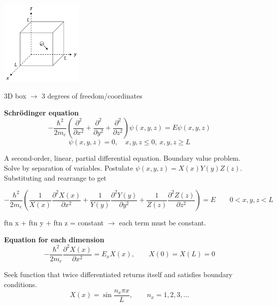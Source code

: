 \documentclass[11pt]{article}
\begin{document}
\begin{center}
\begin{center}
\includegraphics[width=0.3\textwidth]{./Images/Cube.png}
\end{center}
\end{center}

3D box \(\rightarrow\) 3 degrees of freedom/coordinates

\textbf{Schr\"{o}dinger equation}
\begin{equation}
-\frac{\hbar^2}{2m_e} \left ( \frac{\partial^2 }{\partial x^2} + \frac{\partial^2 }{\partial y^2} + \frac{\partial^2 }{\partial z^2} \right ) \psi(x,y,z) = E \psi(x,y,z)
\end{equation}
\begin{equation}
\psi(x,y,z) = 0, \quad x,y,z \leq 0,\ x,y,z \geq L
\end{equation}

A second-order, linear, partial differential equation.  Boundary value problem. Solve by separation of variables.  Postulate \(\psi(x,y,z) = X(x)Y(y)Z(z)\). Substituting and rearrange to get

\begin{equation}
-\frac{\hbar^2}{2m_e} \left (\frac{1}{X(x)}\frac{\partial^2 X(x)}{\partial x^2} + \frac{1}{Y(y)}\frac{\partial^2 Y(y)}{\partial y^2} + \frac{1}{Z(z)}\frac{\partial^2 Z(z)}{\partial z^2} \right ) = E \qquad 0 < x,y,z <L
\end{equation}

ftn x + ftn y + ftn z = constant \(\rightarrow\) each term must be constant.

\textbf{Equation for each dimension}
\begin{equation}
-\frac{\hbar^2}{2m_e}\frac{\partial^2 X(x)}{\partial x^2} = E_x X(x), \qquad X(0)=X(L) = 0
\end{equation}

Seek function that twice differentiated returns itself and satisfies boundary conditions.
\begin{equation}
X(x) = \sin\frac{n_x\pi x}{L},\qquad n_x = 1,2,3,\ldots
\end{equation}
\end{document}
